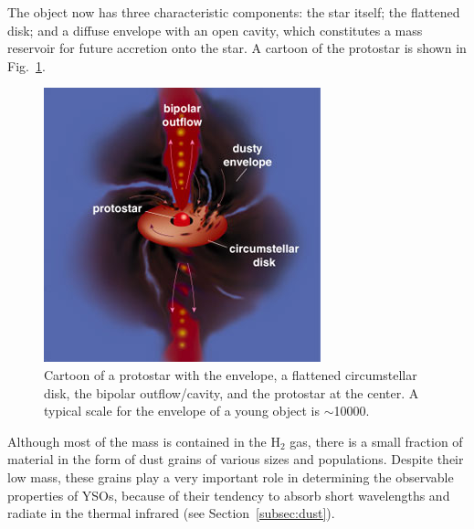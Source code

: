 The object now has three characteristic components: the star itself; the flattened disk; and a diffuse envelope with an open cavity, which constitutes a mass reservoir for future accretion onto the star. A cartoon of the protostar is shown in Fig.~\ref{fig:Protostar}.

\begin{figure}[!ht]
	\centering
	\includegraphics{Figures/protostar.jpg} 
	\caption[Protostar]{Cartoon of a protostar \citep{Greene:2001dg} with the envelope, a flattened circumstellar disk, the bipolar outflow/cavity, and the protostar at the center. A typical scale for the envelope of a young object is $\sim$\SI{10000}{\au}.}
	\label{fig:Protostar}
    \end{figure}



Although most of the mass is contained in the $\textrm{H}_2$ gas, there is a small fraction of material in the form of dust grains of various sizes and populations. Despite their low mass, these grains play a very important role in determining the observable properties of YSOs, because of their tendency to absorb short wavelengths and radiate in the thermal infrared (see Section~\ref{subsec:dust}). 


